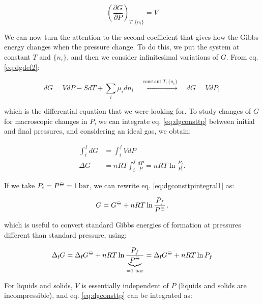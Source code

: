\documentclass[
  9pt,
]{extbook}
\theoremstyle{definition}
\theoremstyle{definition}
\theoremstyle{definition}
\theoremstyle{definition}
\theoremstyle{remark}
\begin{document}
\[
\left(\frac{\partial G}{\partial P} \right)_{T,\{n_i\}}=V
\]

We can now turn the attention to the second coefficient that gives how the Gibbs energy changes when the pressure change. To do this, we put the system at constant \(T\) and \(\{n_i\}\), and then we consider infinitesimal variations of \(G\). From eq. \eqref{eq:dgdef2}:

\begin{equation}
dG = VdP -SdT +\sum_i\mu_i dn_i \quad \xrightarrow{\text{constant}\; T,\{n_i\}} \quad dG = VdP,
\label{eq:dgconsttp}
\end{equation}

which is the differential equation that we were looking for. To study changes of \(G\) for macroscopic changes in \(P\), we can integrate eq. \eqref{eq:dgconsttp} between initial and final pressures, and considering an ideal gas, we obtain:

\begin{equation}
\begin{aligned}
\int_i^f dG &= \int_i^f VdP \\
\Delta G &= nRT \int_i^f \frac{dP}{P} = nRT \ln \frac{P_f}{P_i}.
\end{aligned}
\label{eq:dgconsttpintegral1}
\end{equation}

If we take \(P_i = P^{-\kern-6pt{\ominus}\kern-6pt-}= 1 \, \text{bar}\), we can rewrite eq. \eqref{eq:dgconsttpintegral1} as:

\begin{equation}
G = G^{-\kern-6pt{\ominus}\kern-6pt-}+ nRT \ln \frac{P_f}{P^{-\kern-6pt{\ominus}\kern-6pt-}},
\label{eq:dgconsttpintegral2}
\end{equation}

which is useful to convert standard Gibbs energies of formation at pressures different than standard pressure, using:

\begin{equation}
\Delta_{\text{f}} G = \Delta_{\text{f}} G^{-\kern-6pt{\ominus}\kern-6pt-}+ nRT \ln \frac{P_f}{\underbrace{P^{-\kern-6pt{\ominus}\kern-6pt-}}_{=1 \; \text{bar}}} = \Delta_{\text{f}} G^{-\kern-6pt{\ominus}\kern-6pt-}+ nRT \ln P_f
\label{eq:dgconsttpintegral2b}
\end{equation}

For liquids and solids, \(V\) is essentially independent of \(P\) (liquids and solids are incompressible), and eq. \eqref{eq:dgconsttp} can be integrated as:
\end{document}
